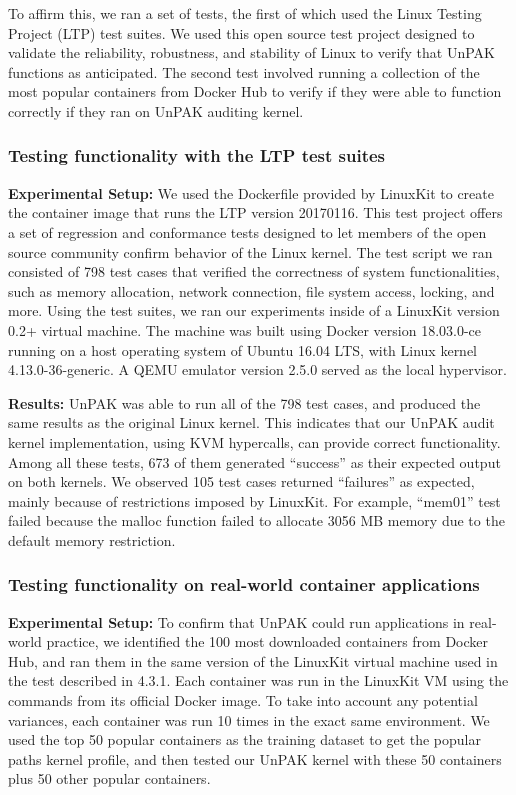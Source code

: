 To affirm this, we ran a set of tests, the first of which used the Linux Testing Project (LTP) \cite{LTP} test suites. 
We used this open source test project designed to validate the reliability, robustness, and stability of Linux to verify that UnPAK functions as anticipated. 
The second test involved running a collection of the most popular containers from Docker Hub to verify if they were able to function correctly if they ran on UnPAK auditing kernel.

\subsubsection{Testing functionality with the LTP test suites}
\label{sec.evaluation.3.1} 
\textbf{Experimental Setup:} We used the Dockerfile provided by LinuxKit \cite{LinuxKit} to create the container image that runs the LTP version 20170116. 
This test project offers a set of regression and conformance tests designed to let members of the open source community confirm behavior of the Linux kernel. 
The test script we ran consisted of 798 test cases that verified the correctness of system functionalities, such as memory allocation, network connection, file system access, locking, and more. 
Using the test suites, we ran our experiments inside of a LinuxKit version 0.2+ virtual machine. The machine was built using Docker version 18.03.0-ce running on 
a host operating system of Ubuntu 16.04 LTS, with Linux kernel 4.13.0-36-generic. A QEMU emulator version 2.5.0 served as the local hypervisor. 

\textbf{Results:}  UnPAK was able to run all of the 798 test cases, and produced the same results as the original Linux kernel. 
This indicates that our UnPAK audit kernel implementation, using KVM hypercalls, can provide correct functionality. 
Among all these tests, 673 of them generated ``success'' as their expected output on both kernels. We observed 105 test cases returned ``failures'' as expected, 
mainly because of restrictions imposed by LinuxKit. For example, ``mem01'' test failed because the malloc function failed to allocate 3056 MB memory due to the default memory restriction. 

\subsubsection{Testing functionality on real-world container applications}
\label{sec.evaluation.3.2} 
\textbf{Experimental Setup:} To confirm that UnPAK could run applications in real-world practice, we identified the 100 most downloaded containers from Docker Hub, 
and ran them in the same version of the LinuxKit virtual machine used in the test described in 4.3.1. Each container was run in the LinuxKit VM using the commands from its official Docker image. 
To take into account any potential variances, each container was run 10 times in the exact same environment. We used the top 50 popular containers as the training dataset to 
get the popular paths kernel profile, and then tested our UnPAK kernel with these 50 containers plus 50 other popular containers. 

